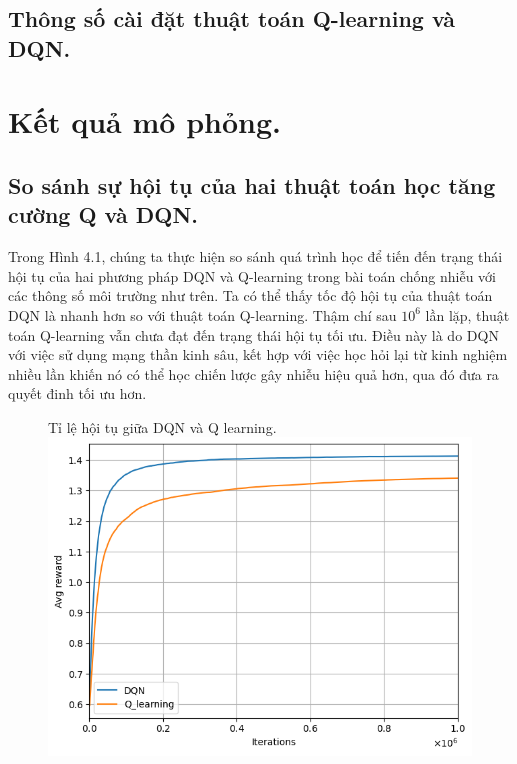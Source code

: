 \documentclass{uetgraduation}
\begin{document}
\subsection{Thông số cài đặt thuật toán Q-learning và DQN.}


\section{Kết quả mô phỏng.}
\subsection{So sánh sự hội tụ của hai thuật toán học tăng cường Q và DQN.}
Trong Hình 4.1, chúng ta thực hiện so sánh quá trình học để tiến đến trạng thái hội tụ của hai phương pháp DQN và Q-learning trong bài toán
chống nhiễu với các thông số môi trường như trên. Ta có thể thấy tốc độ hội tụ của thuật toán DQN là nhanh hơn so với thuật toán Q-learning.
Thậm chí sau $10^6$ lần lặp, thuật toán Q-learning vẫn chưa đạt đến trạng thái hội tụ tối ưu. Điều này là do DQN với việc sử dụng mạng thần
kinh sâu, kết hợp với việc học hỏi lại từ kinh nghiệm nhiều lần khiến nó có thể học chiến lược gây nhiễu hiệu quả hơn, qua đó đưa ra quyết đinh
tối ưu hơn.

\begin{figure}{Tỉ lệ hội tụ giữa DQN và Q learning.}
    \centering
    \includegraphics[scale=0.5]{converged}
    \label{fig:converged}
\end{figure}
\end{document}
